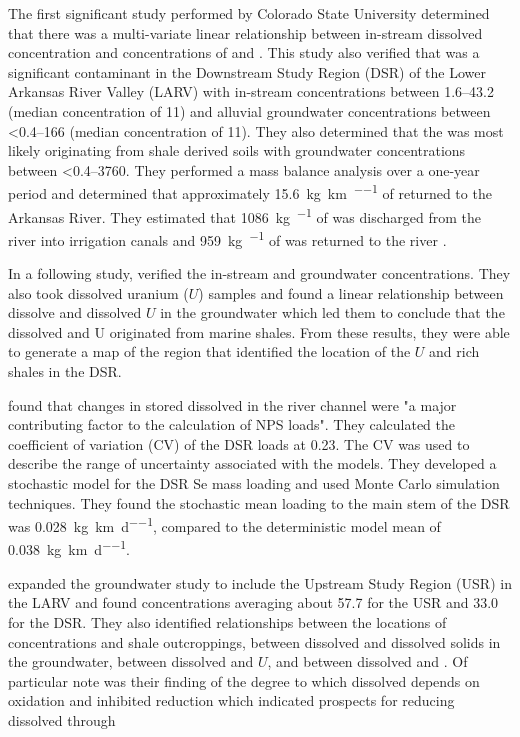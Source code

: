 \begin{linenumbers}[1]
The first significant \Se study performed by Colorado State University determined that there was a multi-variate linear relationship between in-stream dissolved \Se concentration and concentrations of \sulfate and \nitrate.  This study also verified that \Se was a significant contaminant in the Downstream Study Region (DSR) of the Lower Arkansas River Valley (LARV) with in-stream concentrations between \SIrange{1.6}{43.2}{\mgl} (median concentration of \SI{11}{\mgl}) and alluvial groundwater concentrations between \SIrange{<0.4}{166}{\mgl} (median concentration of \SI{11}{\mgl}).  They also determined that the \Se was most likely originating from shale derived soils with groundwater concentrations between \SIrange{<0.4}{3760}{\mgl}.  They performed a mass balance analysis over a one-year period and determined that approximately \SI{15.6}{\kilo\g\per\kilo\m\per\year} of \Se returned to the Arkansas River.  They estimated that \SI{1086}{\kilo\g\per\year} of \Se was discharged from the river into irrigation canals and \SI{959}{\kilo\g\per\year} of \Se was returned to the river \parencite{donnelly2005}.

In a following study, \textcite{herting2006} verified the in-stream and groundwater \Se concentrations.  They also took dissolved uranium ($ U $) samples and found a linear relationship between dissolve \Se and dissolved $ U $ in the groundwater which led them to conclude that the dissolved \Se and U originated from marine shales.  From these results, they were able to generate a map of the region that identified the location of the $ U $ and \Se rich shales in the DSR.

\textcite{Mueller2008} found that changes in stored dissolved \Se in the river channel were "a major contributing factor to the calculation of NPS loads".  They calculated the coefficient of variation (CV) of the DSR \Se loads at 0.23.  The CV was used to describe the range of uncertainty associated with the models.  They developed a stochastic model for the DSR Se mass loading and used Monte Carlo simulation techniques.  They found the stochastic mean \Se loading to the main stem of the DSR was \SI{0.028}{\kilo\g\per\kilo\m\per\day}, compared to the deterministic model mean of \SI{0.038}{\kilo\g\per\kilo\m\per\day}.

\textcite{gates2009} expanded the \Se groundwater study to include the Upstream Study Region (USR) in the LARV and found concentrations averaging about \SI{57.7}{\mgl} for the USR and \SI{33.0}{\mgl} for the DSR.  They also identified relationships between the locations of \Se concentrations and shale outcroppings, between dissolved \Se and dissolved solids in the groundwater, between dissolved \Se and $ U $, and between dissolved \Se and \nitrate.  Of particular note was their finding of the degree to which dissolved \Se depends on oxidation and inhibited reduction which indicated prospects for reducing dissolved \Se through 


\end{linenumbers}
